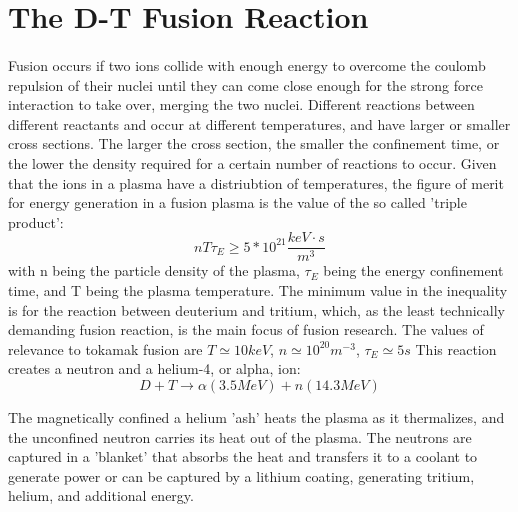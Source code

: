 \section{The D-T Fusion Reaction}
\paragraph{}
Fusion occurs if two ions collide with enough energy to overcome the coulomb repulsion of their nuclei until they can come close enough for the strong force interaction to take over, merging the two nuclei.  Different reactions between different reactants and occur at different temperatures, and have larger or smaller cross sections.  The larger the cross section, the smaller the confinement time, or the lower the density required for a certain number of reactions to occur.  Given that the ions in a plasma have a distriubtion of temperatures, the figure of merit for energy generation in a fusion plasma is the value of the so called 'triple product':\begin{equation}
nT\tau_E \geq 5*10^{21} \frac{keV\cdot s}{m^3}
\end{equation} with n being the particle density of the plasma, $\tau_E$ being the energy confinement time, and T being the plasma temperature.  The minimum value in the inequality is for the reaction between deuterium and tritium, which, as the least technically demanding fusion reaction, is the main focus of fusion research.  The values of relevance to tokamak fusion are $T \simeq 10keV$, $n \simeq 10^{20}m^{-3}$, $\tau_E \simeq  5s$ This reaction creates a neutron and a helium-4, or alpha, ion:\begin{equation}
D+T \rightarrow \alpha(3.5MeV) + n(14.3 MeV)
\end{equation}

The magnetically confined a helium 'ash' heats the plasma as it thermalizes, and the unconfined neutron carries its heat out of the plasma.  The neutrons are captured in a 'blanket' that absorbs the heat and transfers it to a coolant to generate power or can be captured by a lithium coating, generating tritium, helium, and additional energy.

